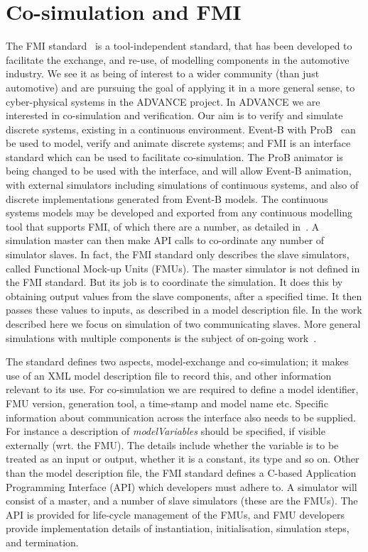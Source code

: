\documentclass{llncs}%
\begin{document}
\section{Co-simulation and FMI}\label{FMI}
The FMI standard~\cite{bloch2012,bloch2011} is a tool-independent standard, that has been developed to facilitate the exchange, and re-use, of modelling components in the automotive industry. We see it as being of interest to a wider community (than just automotive) and are pursuing the goal of applying it in a more general sense, to cyber-physical systems in the ADVANCE project. In ADVANCE we are interested in co-simulation and verification. Our aim is to verify and simulate discrete systems, existing in a continuous environment. Event-B with ProB~\cite{LeuschelB08} can be used to model, verify and animate discrete systems; and FMI is an interface standard which can be used to facilitate co-simulation. The ProB animator is being changed to be used with the interface, and will allow Event-B animation, with external simulators including simulations of continuous systems, and also of discrete implementations generated from Event-B models. The continuous systems models may be developed and exported from any continuous modelling tool that supports FMI, of which there are a number, as detailed in~\cite{FMISTD}. A simulation master can then make API calls to co-ordinate any number of simulator slaves. In fact, the FMI standard only describes the slave simulators, called Functional Mock-up Units (FMUs). The master simulator is not defined in the FMI standard. But its job is to coordinate the simulation. It does this by obtaining output values from the slave components, after a specified time. It then passes these values to inputs, as described in a model description file. In the work described here we focus on simulation of two communicating slaves.  More general simulations with multiple components is the subject of on-going work~\cite{eps360400}.

The standard defines two aspects, model-exchange and co-simulation; it makes use of an XML model description file to record this, and other information relevant to its use. For co-simulation we are required to define a model identifier, FMU version, generation tool, a time-stamp and model name etc. Specific information about communication across the interface also needs to be supplied. For instance a description of \emph{modelVariables} should be specified, if visible externally (wrt. the FMU). The details include whether the variable is to be treated as an input or output, whether it is a constant, its type and so on. Other than the model description file, the FMI standard defines a C-based Application Programming Interface (API) which developers must adhere to. A simulator will consist of a master, and a number of slave simulators (these are the FMUs). The API is provided for life-cycle management of the FMUs, and FMU developers provide implementation details of instantiation, initialisation, simulation steps, and termination. 
\end{document}
